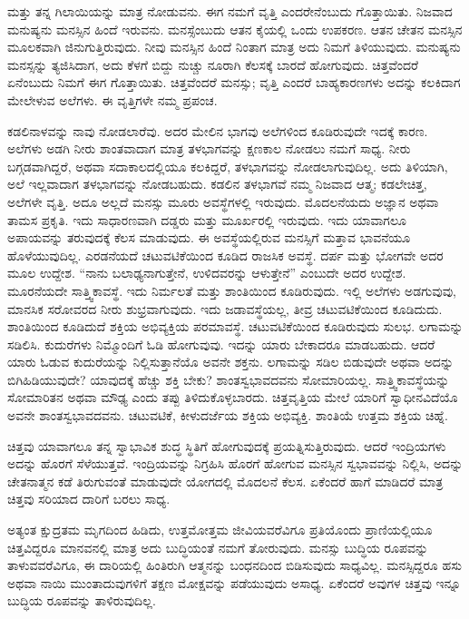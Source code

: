 ಮತ್ತು ತನ್ನ ಗಿಲಾಯಿಯನ್ನು ಮಾತ್ರ ನೋಡುವನು. ಈಗ ನಮಗೆ ವೃತ್ತಿ ಎಂದರೇನೆಂಬುದು ಗೊತ್ತಾಯಿತು. ನಿಜವಾದ ಮನುಷ್ಯನು ಮನಸ್ಸಿನ ಹಿಂದೆ ಇರುವನು. ಮನಸ್ಸೆಂಬುದು ಆತನ ಕೈಯಲ್ಲಿ ಒಂದು ಉಪಕರಣ. ಆತನ ಚೇತನ ಮನಸ್ಸಿನ ಮೂಲಕವಾಗಿ ಜಿನುಗುತ್ತಿರುವುದು. ನೀವು ಮನಸ್ಸಿನ ಹಿಂದೆ ನಿಂತಾಗ ಮಾತ್ರ ಅದು ನಿಮಗೆ ತಿಳಿಯುವುದು. ಮನುಷ್ಯನು ಮನಸ್ಸನ್ನು ತ್ಯಜಿಸಿದಾಗ, ಅದು ಕೆಳಗೆ ಬಿದ್ದು ನುಚ್ಚು ನೂರಾಗಿ ಕೆಲಸಕ್ಕೆ ಬಾರದೆ ಹೋಗುವುದು. ಚಿತ್ತವೆಂದರೆ ಏನೆಂಬುದು ನಿಮಗೆ ಈಗ ಗೊತ್ತಾಯಿತು. ಚಿತ್ತವೆಂದರೆ ಮನಸ್ಸು; ವೃತ್ತಿ ಎಂದರೆ ಬಾಹ್ಯಕಾರಣಗಳು ಅದನ್ನು ಕಲಕಿದಾಗ ಮೇಲೇಳುವ ಅಲೆಗಳು. ಈ ವೃತ್ತಿಗಳೇ ನಮ್ಮ ಪ್ರಪಂಚ. 

ಕಡಲಿನಾಳವನ್ನು ನಾವು ನೋಡಲಾರೆವು. ಅದರ ಮೇಲಿನ ಭಾಗವು ಅಲೆಗಳಿಂದ ಕೂಡಿರುವುದೇ ಇದಕ್ಕೆ ಕಾರಣ. ಅಲೆಗಳು ಅಡಗಿ ನೀರು ಶಾಂತವಾದಾಗ ಮಾತ್ರ ತಳಭಾಗವನ್ನು ಕ್ಷಣಕಾಲ ನೋಡಲು ನಮಗೆ ಸಾಧ್ಯ. ನೀರು ಬಗ್ಗಡವಾಗಿದ್ದರೆ, ಅಥವಾ ಸದಾಕಾಲದಲ್ಲಿಯೂ ಕಲಕಿದ್ದರೆ, ತಳಭಾಗವನ್ನು ನೋಡಲಾಗುವುದಿಲ್ಲ. ಅದು ತಿಳಿಯಾಗಿ, ಅಲೆ ಇಲ್ಲವಾದಾಗ ತಳಭಾಗವನ್ನು ನೋಡಬಹುದು. ಕಡಲಿನ ತಳಭಾಗವೆ ನಮ್ಮ ನಿಜವಾದ ಆತ್ಮ; ಕಡಲೇಚಿತ್ತ, ಅಲೆಗಳೇ ವೃತ್ತಿ. ಅದೂ ಅಲ್ಲದೆ ಮನಸ್ಸು ಮೂರು ಅವಸ್ಥೆಗಳಲ್ಲಿ ಇರುವುದು. ಮೊದಲನೆಯದು ಅಜ್ಞಾನ ಅಥವಾ ತಾಮಸ ಪ್ರಕೃತಿ. ಇದು ಸಾಧಾರಣವಾಗಿ ದಡ್ಡರು ಮತ್ತು ಮೂರ್ಖರಲ್ಲಿ ಇರುವುದು. ಇದು ಯಾವಾಗಲೂ ಅಪಾಯವನ್ನು ತರುವುದಕ್ಕೆ ಕೆಲಸ ಮಾಡುವುದು. ಈ ಅವಸ್ಥೆಯಲ್ಲಿರುವ ಮನಸ್ಸಿಗೆ ಮತ್ತಾವ ಭಾವನೆಯೂ ಹೊಳೆಯುವುದಿಲ್ಲ. ಎರಡನೆಯದೆ ಚಟುವಟಿಕೆಯಿಂದ ಕೂಡಿದ ರಾಜಸಿಕ ಅವಸ್ಥೆ. ದರ್ಪ ಮತ್ತು ಭೋಗವೇ ಅದರ ಮೂಲ ಉದ್ದೇಶ. “ನಾನು ಬಲಾಢ್ಯನಾಗುತ್ತೇನೆ, ಉಳಿದವರನ್ನು ಆಳುತ್ತೇನೆ” ಎಂಬುದೇ ಅದರ ಉದ್ದೇಶ. ಮೂರನೆಯದೇ ಸಾತ್ತ್ವಿಕಾವಸ್ಥೆ. ಇದು ನಿರ್ಮಲತೆ ಮತ್ತು ಶಾಂತಿಯಿಂದ ಕೂಡಿರುವುದು. ಇಲ್ಲಿ ಅಲೆಗಳು ಅಡಗುವುವು, ಮಾನಸಿಕ ಸರೋವರದ ನೀರು ಶುಭ್ರವಾಗುವುದು. ಇದು ಜಡಾವಸ್ಥೆಯಲ್ಲ, ತೀವ್ರ ಚಟುವಟಿಕೆಯಿಂದ ಕೂಡಿದುದು. ಶಾಂತಿಯಿಂದ ಕೂಡಿದುದೆ ಶಕ್ತಿಯ ಅಭಿವ್ಯಕ್ತಿಯ ಪರಮಾವಸ್ಥೆ. ಚಟುವಟಿಕೆಯಿಂದ ಕೂಡಿರುವುದು ಸುಲಭ. ಲಗಾಮನ್ನು ಸಡಿಲಿಸಿ. ಕುದುರೆಗಳು ನಿಮ್ಮೊಂದಿಗೆ ಓಡಿ ಹೋಗುವುವು. ಇದನ್ನು ಯಾರು ಬೇಕಾದರೂ ಮಾಡಬಹುದು. ಆದರೆ ಯಾರು ಓಡುವ ಕುದುರೆಯನ್ನು ನಿಲ್ಲಿಸುತ್ತಾನೆಯೊ ಅವನೇ ಶಕ್ತನು. ಲಗಾಮನ್ನು ಸಡಿಲ ಬಿಡುವುದೇ ಅಥವಾ ಅದನ್ನು ಬಿಗಿಹಿಡಿಯುವುದೇ? ಯಾವುದಕ್ಕೆ ಹೆಚ್ಚು ಶಕ್ತಿ ಬೇಕು? ಶಾಂತಸ್ವಭಾವದವನು ಸೋಮಾರಿಯಲ್ಲ. ಸಾತ್ತ್ವಿಕಾವಸ್ಥೆಯನ್ನು ಸೋಮಾರಿತನ ಅಥವಾ ಮೌಢ್ಯ ಎಂದು ತಪ್ಪು ತಿಳಿದುಕೊಳ್ಳಬಾರದು. ಚಿತ್ತವೃತ್ತಿಯ ಮೇಲೆ ಯಾರಿಗೆ ಸ್ವಾಧೀನವಿದೆಯೊ ಅವನೇ ಶಾಂತಸ್ವಭಾವದವನು. ಚಟುವಟಿಕೆ, ಕೀಳುದರ್ಜೆಯ ಶಕ್ತಿಯ ಅಭಿವ್ಯಕ್ತಿ. ಶಾಂತಿಯೆ ಉತ್ತಮ ಶಕ್ತಿಯ ಚಿಹ್ನೆ. 

ಚಿತ್ತವು ಯಾವಾಗಲೂ ತನ್ನ ಸ್ವಾಭಾವಿಕ ಶುದ್ಧ ಸ್ಥಿತಿಗೆ ಹೋಗುವುದಕ್ಕೆ ಪ್ರಯತ್ನಿಸುತ್ತಿರುವುದು. ಆದರೆ ಇಂದ್ರಿಯಗಳು ಅದನ್ನು ಹೊರಗೆ ಸೆಳೆಯುತ್ತವೆ. ಇಂದ್ರಿಯವನ್ನು ನಿಗ್ರಹಿಸಿ ಹೊರಗೆ ಹೋಗುವ ಮನಸ್ಸಿನ ಸ್ವಭಾವವನ್ನು ನಿಲ್ಲಿಸಿ, ಅದನ್ನು ಚೇತನಾತ್ಮನ ಕಡೆ ತಿರುಗುವಂತೆ ಮಾಡುವುದೇ ಯೋಗದಲ್ಲಿ ಮೊದಲನೆ ಕೆಲಸ. ಏಕೆಂದರೆ ಹಾಗೆ ಮಾಡಿದರೆ ಮಾತ್ರ ಚಿತ್ತವು ಸರಿಯಾದ ದಾರಿಗೆ ಬರಲು ಸಾಧ್ಯ. 

ಅತ್ಯಂತ ಕ್ಷುದ್ರತಮ ಮೃಗದಿಂದ ಹಿಡಿದು, ಉತ್ತಮೋತ್ತಮ ಜೀವಿಯವರೆವಿಗೂ ಪ್ರತಿಯೊಂದು ಪ್ರಾಣಿಯಲ್ಲಿಯೂ ಚಿತ್ತವಿದ್ದರೂ ಮಾನವನಲ್ಲಿ ಮಾತ್ರ ಅದು ಬುದ್ಧಿಯಂತೆ ನಮಗೆ ತೋರುವುದು. ಮನಸ್ಸು ಬುದ್ಧಿಯ ರೂಪವನ್ನು ತಾಳುವವರೆವಿಗೂ, ಈ ದಾರಿಯಲ್ಲಿ ಹಿಂತಿರುಗಿ ಆತ್ಮನನ್ನು ಬಂಧನದಿಂದ ಬಿಡಿಸುವುದು ಸಾಧ್ಯವಿಲ್ಲ. ಮನಸ್ಸಿದ್ದರೂ ಹಸು ಅಥವಾ ನಾಯಿ ಮುಂತಾದುವುಗಳಿಗೆ ತಕ್ಷಣ ಮೋಕ್ಷವನ್ನು ಪಡೆಯುವುದು ಅಸಾಧ್ಯ. ಏಕೆಂದರೆ ಅವುಗಳ ಚಿತ್ತವು ಇನ್ನೂ ಬುದ್ಧಿಯ ರೂಪವನ್ನು ತಾಳಿರುವುದಿಲ್ಲ. 

